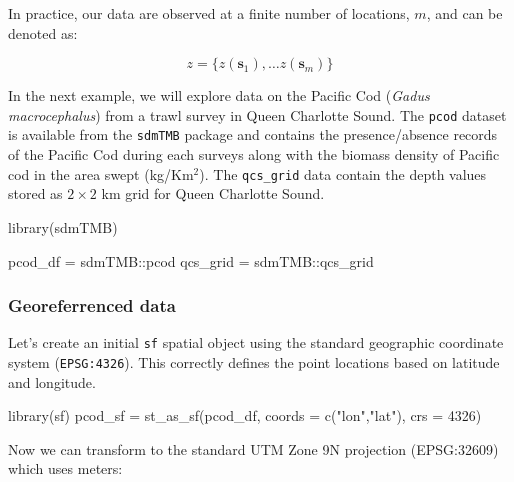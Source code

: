 \documentclass[
  letterpaper,
  DIV=11,
  numbers=noendperiod]{scrartcl}
\newenvironment{Shaded}{\begin{snugshade}}{\end{snugshade}}
\newcommand{\AttributeTok}[1]{\textcolor[rgb]{0.40,0.45,0.13}{#1}}
\newcommand{\DecValTok}[1]{\textcolor[rgb]{0.68,0.00,0.00}{#1}}
\newcommand{\FunctionTok}[1]{\textcolor[rgb]{0.28,0.35,0.67}{#1}}
\newcommand{\NormalTok}[1]{\textcolor[rgb]{0.00,0.23,0.31}{#1}}
\newcommand{\OtherTok}[1]{\textcolor[rgb]{0.00,0.23,0.31}{#1}}
\newcommand{\SpecialCharTok}[1]{\textcolor[rgb]{0.37,0.37,0.37}{#1}}
\newcommand{\StringTok}[1]{\textcolor[rgb]{0.13,0.47,0.30}{#1}}
\begin{document}
In practice, our data are observed at a finite number of locations,
\(m\), and can be denoted as:

\[z = \{z(\mathbf{s}_1), \ldots z(\mathbf{s}_m) \}\]

In the next example, we will explore data on the Pacific Cod
(\emph{Gadus macrocephalus}) from a trawl survey in Queen Charlotte
Sound. The \texttt{pcod} dataset is available from the \texttt{sdmTMB}
package and contains the presence/absence records of the Pacific Cod
during each surveys along with the biomass density of Pacific cod in the
area swept (kg/Km\(^2\)). The \texttt{qcs\_grid} data contain the depth
values stored as \(2\times 2\) km grid for Queen Charlotte Sound.

\begin{Shaded}
\begin{Highlighting}[]
\FunctionTok{library}\NormalTok{(sdmTMB)}

\NormalTok{pcod\_df }\OtherTok{=}\NormalTok{ sdmTMB}\SpecialCharTok{::}\NormalTok{pcod }
\NormalTok{qcs\_grid }\OtherTok{=}\NormalTok{ sdmTMB}\SpecialCharTok{::}\NormalTok{qcs\_grid}
\end{Highlighting}
\end{Shaded}

\subsubsection{Georeferrenced data}\label{georeferrenced-data}

Let's create an initial \texttt{sf} spatial object using the standard
geographic coordinate system (\texttt{EPSG:4326}). This correctly
defines the point locations based on latitude and longitude.

\begin{Shaded}
\begin{Highlighting}[]
\FunctionTok{library}\NormalTok{(sf)}
\NormalTok{pcod\_sf }\OtherTok{=}   \FunctionTok{st\_as\_sf}\NormalTok{(pcod\_df, }\AttributeTok{coords =} \FunctionTok{c}\NormalTok{(}\StringTok{"lon"}\NormalTok{,}\StringTok{"lat"}\NormalTok{), }\AttributeTok{crs =} \DecValTok{4326}\NormalTok{)}
\end{Highlighting}
\end{Shaded}

Now we can transform to the standard UTM Zone 9N projection (EPSG:32609)
which uses meters:

\begin{Shaded}
\end{Shaded}
\end{document}
